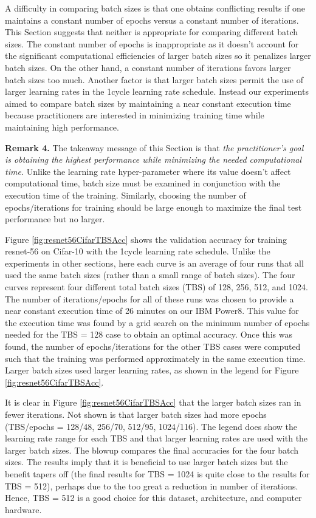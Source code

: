 \documentclass{article} %
\begin{document}
A difficulty in comparing batch sizes is that one obtains conflicting results if one maintains a constant number of epochs versus a constant number of iterations.  This Section suggests that neither is appropriate for comparing different batch sizes.  The constant number of epochs is inappropriate as it doesn't account for the significant computational efficiencies of larger batch sizes so it penalizes larger batch sizes.  On the other hand, a constant number of iterations favors larger batch sizes too much.  Another factor is that larger batch sizes permit the use of larger learning rates in the 1cycle learning rate schedule.   Instead our experiments aimed to compare batch sizes by maintaining a near constant execution time because practitioners are interested in minimizing training time while maintaining high performance.  

\textbf{Remark 4.}
The takeaway message of this Section is that \emph{the practitioner's goal is obtaining the highest performance while minimizing the needed computational time.}  Unlike the learning rate hyper-parameter where its value doesn't affect computational time, batch size must be examined in conjunction with the execution time of the training.  Similarly, choosing the number of epochs/iterations for training should be large enough to maximize the final test performance but no larger.

Figure \ref{fig:resnet56CifarTBSAcc} shows the validation accuracy for training resnet-56 on Cifar-10 with the 1cycle learning rate schedule. Unlike the experiments in other sections, here each curve is an average of four runs that all used the same batch sizes (rather than a small range of batch sizes).  The four curves represent four different total batch sizes (TBS) of 128, 256, 512, and 1024.  The number of iterations/epochs for all of these runs was chosen to provide a near constant execution time of 26 minutes on our IBM Power8.  This value for the execution time was found by a grid search on the minimum number of epochs needed for the TBS = 128 case to obtain an optimal accuracy.  Once this was found, the number of epochs/iterations for the other TBS cases were computed such that the training was performed approximately in the same execution time.  Larger batch sizes used larger learning rates, as shown in the legend for Figure \ref{fig:resnet56CifarTBSAcc}.

It is clear in Figure \ref{fig:resnet56CifarTBSAcc} that the larger batch sizes ran in fewer iterations.  Not shown is that larger batch sizes had more epochs (TBS/epochs = 128/48, 256/70, 512/95, 1024/116).  The legend does show the learning rate range for each TBS and that larger learning rates are used with the larger batch sizes.  The blowup compares the final accuracies for the four batch sizes.  The results imply that it is beneficial to use larger batch sizes but the benefit tapers off (the final results for TBS = 1024 is quite close to the results for TBS = 512), perhaps due to the too great a reduction in number of iterations. Hence, TBS = 512 is a good choice for this dataset, architecture, and computer hardware.   
\end{document}
